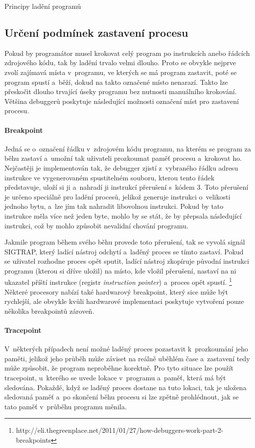 \documentclass[czech,bachelor,male,python,dept460,hidelinks]{diploma}						%
\newcommand{\parspace}[1][]{
	\ifthenelse{\isempty{#1}}{\vspace{0mm}}{\vspace{#1}}
	\par
}
\begin{document}
\begin{section}{Principy ladění programů}
	\subsection{Určení podmínek zastavení procesu}
		Pokud by programátor musel krokovat celý program po instrukcích anebo řádcích zdrojového kódu, tak by ladění trvalo velmi dlouho.
		Proto se obvykle nejprve zvolí zajímavá místa v~programu, ve kterých se má program zastavit, poté se program spustí a~běží, dokud na takto označené místo
		nenarazí. Takto lze přeskočit dlouho trvající úseky programu bez nutnosti manuálního krokování. Většina debuggerů poskytuje následující možnosti označení
		míst pro zastavení procesu.
		
		\paragraph*{Breakpoint}
			Jedná se o~označení řádku v~zdrojovém kódu programu, na kterém se program za běhu zastaví a~umožní tak uživateli prozkoumat paměť procesu a~krokovat ho.
			Nejčastěji je implementován tak, že debugger zjistí z~vybraného řádku adresu instrukce ve vygenerovaném spustitelném souboru, kterou tento
			řádek představuje, uloží si ji a~nahradí ji instrukcí přerušení s~kódem 3. Toto přerušení je určeno speciálně pro ladění procesů, jelikož generuje
			instrukci o~velikosti jednoho bytu, a~lze jím tak nahradit libovolnou instrukci. \cite[306]{intel} Pokud by tato instrukce měla více než jeden byte,
			mohlo by se stát, že by přepsala následující instrukci, což by mohlo způsobit nevalidní chování programu.
			
			\parspace Jakmile program během svého běhu
			provede toto přerušení, tak se vyvolá signál SIGTRAP, který ladící nástroj odchytí a~laděný proces se tímto zastaví. Pokud se uživatel rozhodne proces
			opět sputit, ladící nástroj zkopíruje původní instrukci programu (kterou si dříve uložil) na místo, kde vložil přerušení, nastaví na ni ukazatel
			příští instrukce (registr \textit{instruction pointer}) a~proces opět spustí.
			\footnote{http://eli.thegreenplace.net/2011/01/27/how-debuggers-work-part-2-breakpoints}
			Některé procesory nabízí také hardwarový breakpoint, který sice může být rychlejší, ale obvykle kvůli hardwarové implementaci poskytuje
			vytvoření pouze několika breakpointů zároveň.
		\paragraph*{Tracepoint}
			V~některých případech není možné laděný proces pozastavit k~prozkoumání jeho paměti, jelikož jeho průběh může záviset na reálně uběhlém čase a~zastavení
			tedy může způsobit, že program neproběhne korektně. Pro tyto situace lze použít tracepoint, u~kterého se uvede lokace v~programu a~paměť, která má být
			sledována. Pokaždé, když se laděný proces dostane na tuto lokaci, tak je uložena sledovaná paměť a~po skončení běhu procesu si lze zpětně prohlédnout,
			jak se tato paměť v~průběhu programu měnila.

\end{section}
\end{document}
